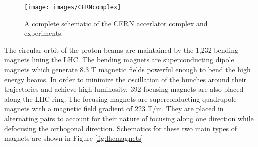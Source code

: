 \begin{figure}[htbp]
  \centering
    \texttt{[image: images/CERNcomplex]}
    \caption[The CERN Accelerator Complex]{A complete schematic of the CERN accerlator complex and experiments.\cite{CERNcomplex}}
    \label{fig:CERNcomplex}
\end{figure}

The circular orbit of the proton beams are maintained by the 1,232 bending magnets lining the LHC. The bending magnets are superconducting dipole magnets which generate 8.3 T magnetic fields powerful enough to bend the high energy beams. In order to minimize the oscillation of the bunches around their trajectories and achieve high luminosity, 392 focusing magnets are also placed along the LHC ring. The focusing magnets are superconducting quadrupole magnets with a magnetic field gradient of 223 T/m. They are placed in alternating pairs to account for their nature of focusing along one direction while defocusing the orthogonal direction. Schematics for these two main types of magnets are shown in Figure \ref{fig:lhcmagnets}

